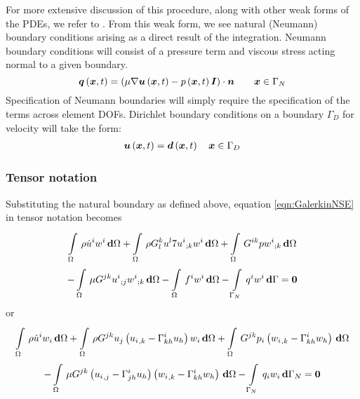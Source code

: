 For more extensive discussion of this procedure, along with other weak forms
of the PDEs, we refer to \cite{gresho:2000}. From this weak form, we see
natural (Neumann) boundary conditions arising as a direct result of the
integration. Neumann boundary conditions will consist of a pressure term and
viscous stress acting normal to a given boundary.
\begin{equation}
  \fnof{\vectr{q}}{\vectr{x},t} =
  \dotprod{\pbrac{\mu\gradient{}{\fnof{\vectr{u}}{\vectr{x},t}}-
      \fnof{p}{\vectr{x},t}\vectr{I}}}{\vectr{n}}  \quad\quad \vectr{x}\in\Gamma_{N}
  \label{eqn:NSENeumannBC}  
\end{equation}
Specification of Neumann boundaries will simply require the specification of
the terms across element DOFs. Dirichlet boundary conditions on a boundary
$\Gamma_D$ for velocity will take the form:
\begin{gather}
  \fnof{\vectr{u}}{\vectr{x},t} = \fnof{\vectr{d}}{\vectr{x},t} \quad \vectr{x}\in\Gamma_{D}\\
  \label{eqn:NSEDirichletBC} 
\end{gather}

\subsubsection{Tensor notation}

Substituting the natural boundary as defined above, equation
\ref{eqn:GalerkinNSE} in tensor notation becomes
\begin{multline}
  \gint{\Omega}{}{\rho\dot{u}^{i}w^{i}}{\Omega}
 +\gint{\Omega}{}{{\rho}G^{k}_{l}u^{l}\covarderiv{7u^{i}}{k}w^{i}}{\Omega}
 +\gint{\Omega}{}{G^{ik}{p}\covarderiv{w^{i}}{k}}{\Omega}\\
 -\gint{\Omega}{}{{\mu}G^{jk}\covarderiv{u^{i}}{j}\covarderiv{w^{i}}{k}}{\Omega}
 -\gint{\Omega}{}{{f^{i}}{w^{i}}}{\Omega}
 -\gint{\Gamma_N}{}{{q^{i}}{w^{i}}}{\Gamma}=\vectr{0}
 \label{eqn:TensorNSE}
\end{multline}
or
\begin{multline}
  \gint{\Omega}{}{\rho\dot{u}^{i}w_{i}}{\Omega}
 +\gint{\Omega}{}{{\rho}G^{jk}{u_j}\pbrac{\partialderiv{u_{i}}{k}-\christoffel{i}{k}{h}u_h}{w_{i}}}{\Omega}
 +\gint{\Omega}{}{G^{jk}{p_{i}}\pbrac{\partialderiv{w_{i}}{k}-\christoffel{i}{k}{h}w_h}}{\Omega}\\
 -\gint{\Omega}{}{{\mu}G^{jk}\pbrac{\partialderiv{u_{i}}{j}-\christoffel{i}{j}{h}u_h}\pbrac{\partialderiv{w_{i}}{k}-\christoffel{i}{k}{h}w_h}}{\Omega}
 -\gint{\Gamma_N}{}{{q_{i}}{w_i}}{\Gamma_N}=\vectr{0}
 \label{eqn:Tensor2NSE}
\end{multline}

